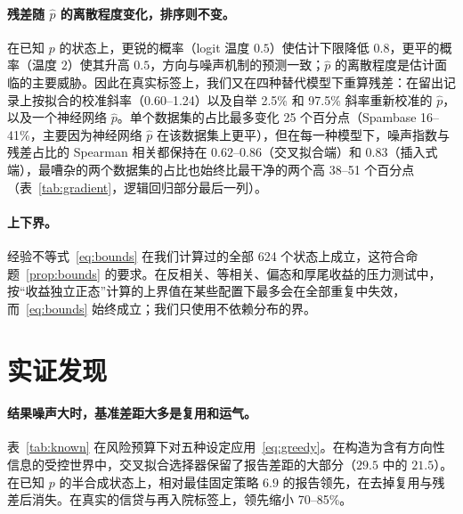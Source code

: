 \documentclass[runningheads]{llncs}
\begin{document}
\paragraph{残差随 $\hat p$ 的离散程度变化，排序则不变。}在已知 $p$ 的状态上，更锐的概率（logit 温度 $0.5$）使估计下限降低 $0.8$，更平的概率（温度 $2$）使其升高 $0.5$，方向与噪声机制的预测一致；$\hat p$ 的离散程度是估计面临的主要威胁。因此在真实标签上，我们又在四种替代模型下重算残差：在留出记录上按拟合的校准斜率（0.60--1.24）以及自举 2.5\% 和 97.5\% 斜率重新校准的 $\hat p$，以及一个神经网络 $\hat p$。单个数据集的占比最多变化 25 个百分点（Spambase 16--41\%，主要因为神经网络 $\hat p$ 在该数据集上更平），但在每一种模型下，噪声指数与残差占比的 Spearman 相关都保持在 $0.62$--$0.86$（交叉拟合端）和 $0.83$（插入式端），最嘈杂的两个数据集的占比也始终比最干净的两个高 38--51 个百分点（表~\ref{tab:gradient}，逻辑回归部分最后一列）。

\paragraph{上下界。}经验不等式~\eqref{eq:bounds} 在我们计算过的全部 624 个状态上成立，这符合命题~\ref{prop:bounds} 的要求。在反相关、等相关、偏态和厚尾收益的压力测试中，按“收益独立正态”计算的上界值在某些配置下最多会在全部重复中失效，而~\eqref{eq:bounds} 始终成立；我们只使用不依赖分布的界。

\section{实证发现}
\label{sec:findings}
\paragraph{结果噪声大时，基准差距大多是复用和运气。}表~\ref{tab:known} 在风险预算下对五种设定应用~\eqref{eq:greedy}。在构造为含有方向性信息的受控世界中，交叉拟合选择器保留了报告差距的大部分（$29.5$ 中的 $21.5$）。在已知 $p$ 的半合成状态上，相对最佳固定策略 $6.9$ 的报告领先，在去掉复用与残差后消失。在真实的信贷与再入院标签上，领先缩小 70--85\%。
\end{document}
